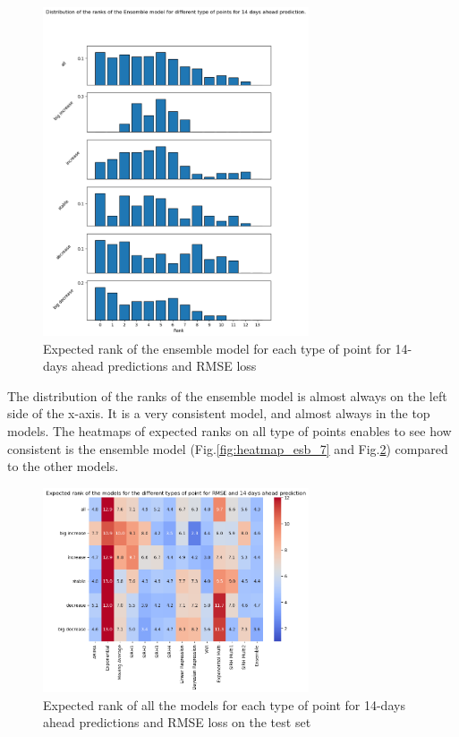 \begin{figure}
    \centering
    \includegraphics[width=0.7\textwidth]{figures/esb_rank_14.png}
    \caption{Expected rank of the ensemble model for each type of point for 14-days ahead predictions and RMSE loss}
    \label{fig:esb_rank_14}
\end{figure}

The distribution of the ranks of the ensemble model is almost always on the left side of the x-axis.
It is a very consistent model, and almost always in the top models. 
The heatmaps of expected ranks on all type of points enables to see how consistent is the ensemble model (Fig.\ref{fig:heatmap_esb_7} and Fig.\ref{fig:heatmap_esb_14}) compared to the other models. 

\begin{figure}
    \centering
    \includegraphics[width=0.7\textwidth]{figures/heatmap_esb_14.png}
    \caption{Expected rank of all the models for each type of point for 14-days ahead predictions and RMSE loss on the test set}
    \label{fig:heatmap_esb_14}
\end{figure}


